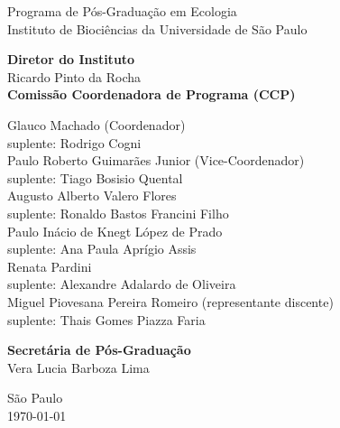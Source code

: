 {\Large Programa de Pós-Graduação em Ecologia \\[1ex]
  Instituto de Biociências da Universidade de São Paulo\\[1ex]
  }
\par
\vspace{0.01\paperheight}

{\large 
  \textbf{Diretor do Instituto} \\[0.5em]
  Ricardo Pinto da Rocha\\
  \vspace{2em}
  \textbf{Comissão Coordenadora de Programa (CCP)} \\[0.5em]
  \begin{spacing}{1.2}
    Glauco Machado (Coordenador)\\
    suplente: Rodrigo Cogni \\ [0.75 em]
    Paulo Roberto Guimarães Junior (Vice-Coordenador)\\
    suplente: Tiago Bosisio Quental \\ [0.75 em]
    Augusto Alberto Valero Flores\\
    suplente: Ronaldo Bastos Francini Filho \\ [0.75 em]
    Paulo Inácio de Knegt López de Prado\\
    suplente: Ana Paula Aprígio Assis\\ [0.75 em]
    Renata Pardini\\
    suplente:  Alexandre Adalardo de Oliveira  \\ [0.75 em]
    Miguel Piovesana Pereira Romeiro  (representante discente)\\ [0.75 em]
    suplente: Thais Gomes Piazza Faria 
  \end{spacing}
  \vspace{1.25em}
  \textbf{Secretária de Pós-Graduação}\\[0.5em]
  Vera Lucia Barboza Lima\\
}

\vfill

{\Large São Paulo\\
\today}

